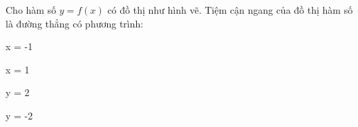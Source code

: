 \begin{question}[type=multiple_choice,difficulty=1,code={I-1}]
Cho hàm số $y = f(x)$ có đồ thị như hình vẽ. Tiệm cận ngang của đồ thị hàm số là đường thẳng có phương trình:



\begin{choice}[label=A]
x = -1
\end{choice}

\begin{choice}[label=B]
x = 1
\end{choice}

\begin{choice}[correct,label=C]
y = 2
\end{choice}

\begin{choice}[label=D]
y = -2
\end{choice}

\end{question}